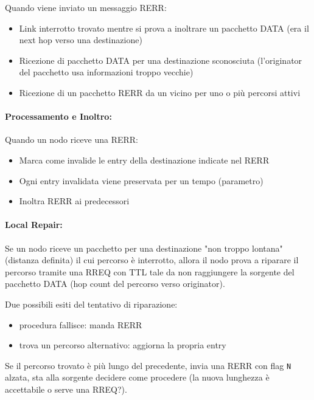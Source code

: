 Quando viene inviato un messaggio RERR:
\begin{itemize}
    \item Link interrotto trovato mentre si prova a inoltrare un pacchetto DATA (era il next hop verso una destinazione)
    
    \item Ricezione di pacchetto DATA per una destinazione sconosciuta (l'originator del pacchetto usa informazioni troppo vecchie)
    
    \item Ricezione di un pacchetto RERR da un vicino per uno o più percorsi attivi
\end{itemize}

\paragraph{Processamento e Inoltro:} Quando un nodo riceve una RERR:
\begin{itemize}
    \item Marca come invalide le entry della destinazione indicate nel RERR 
    
    \item Ogni entry invalidata viene preservata per un tempo (parametro)
    
    \item Inoltra RERR ai predecessori 
\end{itemize}

\paragraph{Local Repair:} Se un nodo riceve un pacchetto per una destinazione "non troppo lontana" (distanza definita) il cui percorso è interrotto, allora il nodo prova a riparare il percorso tramite una RREQ con TTL tale da non raggiungere la sorgente del pacchetto DATA (hop count del percorso verso originator). 

Due possibili esiti del tentativo di riparazione: 
\begin{itemize}
    \item procedura fallisce: manda RERR
    
    \item trova un percorso alternativo: aggiorna la propria entry
\end{itemize}

Se il percorso trovato è più lungo del precedente, invia una RERR con flag \texttt{N} alzata, sta alla sorgente decidere come procedere (la nuova lunghezza è accettabile o serve una RREQ?).